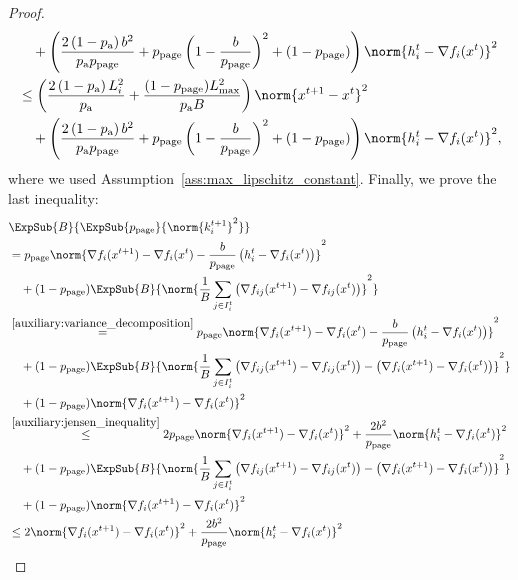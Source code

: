 \documentclass{article}
\newcommand*{\probavailable}{\ensuremath{p_{\textnormal{a}}}}
\newcommand*{\probpage}{\ensuremath{p_{\text{page}}}}
\begin{document}
\begin{proof}
\begin{align*}
    &\quad +\left(\frac{2\left(1 - \probavailable\right)b^2}{\probavailable \probpage} + \probpage\left(1 - \frac{b}{\probpage}\right)^2 + (1 - \probpage)\right)\norm{h^{t}_i - \nabla f_i(x^{t})}^2 \\
    &\leq \left(\frac{2\left(1 - \probavailable\right)L_i^2}{\probavailable} + \frac{(1 - \probpage)L_{\max}^2}{\probavailable B}\right) \norm{x^{t+1} - x^{t}}^2 \\
    &\quad +\left(\frac{2\left(1 - \probavailable\right)b^2}{\probavailable \probpage} + \probpage\left(1 - \frac{b}{\probpage}\right)^2 + (1 - \probpage)\right)\norm{h^{t}_i - \nabla f_i(x^{t})}^2, \\
  \end{align*}
  where we used Assumption~\ref{ass:max_lipschitz_constant}. Finally, we prove the last inequality:
  \begin{align*}
    &\ExpSub{B}{\ExpSub{\probpage}{\norm{k^{t+1}_i}^2}} \\
    &=\probpage \norm{\nabla f_i(x^{t+1}) - \nabla f_i(x^{t}) - \frac{b}{\probpage} \left(h^t_i - \nabla f_i(x^{t})\right)}^2 \\
    &\quad + (1 - \probpage) \ExpSub{B}{\norm{\frac{1}{B}\sum_{j \in I^t_i}\left(\nabla f_{ij}(x^{t+1}) - \nabla f_{ij}(x^{t})\right)}^2} \\
    &\overset{\eqref{auxiliary:variance_decomposition}}{=}\probpage \norm{\nabla f_i(x^{t+1}) - \nabla f_i(x^{t}) - \frac{b}{\probpage} \left(h^t_i - \nabla f_i(x^{t})\right)}^2 \\
    &\quad + (1 - \probpage) \ExpSub{B}{\norm{\frac{1}{B}\sum_{j \in I^t_i}\left(\nabla f_{ij}(x^{t+1}) - \nabla f_{ij}(x^{t})\right) - \left(\nabla f_{i}(x^{t+1}) - \nabla f_{i}(x^{t})\right)}^2} \\
    &\quad + (1 - \probpage) \norm{\nabla f_{i}(x^{t+1}) - \nabla f_{i}(x^{t})}^2\\
    &\overset{\eqref{auxiliary:jensen_inequality}}{\leq}2 \probpage \norm{\nabla f_i(x^{t+1}) - \nabla f_i(x^{t})}^2 +  \frac{2b^2}{\probpage} \norm{h^t_i - \nabla f_i(x^{t})}^2 \\
    &\quad + (1 - \probpage) \ExpSub{B}{\norm{\frac{1}{B}\sum_{j \in I^t_i}\left(\nabla f_{ij}(x^{t+1}) - \nabla f_{ij}(x^{t})\right) - \left(\nabla f_{i}(x^{t+1}) - \nabla f_{i}(x^{t})\right)}^2} \\
    &\quad + (1 - \probpage) \norm{\nabla f_{i}(x^{t+1}) - \nabla f_{i}(x^{t})}^2\\
    &\leq2 \norm{\nabla f_i(x^{t+1}) - \nabla f_i(x^{t})}^2 +  \frac{2b^2}{\probpage} \norm{h^t_i - \nabla f_i(x^{t})}^2 \\

\end{align*}
\end{proof}
\end{document}
